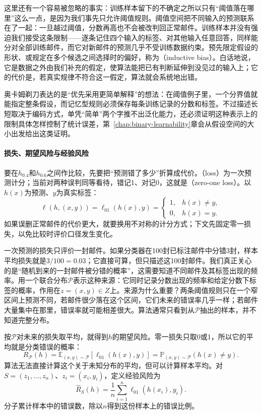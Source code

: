 这里还有一个容易被忽略的事实：训练样本留下的不确定之所以只有“阈值落在哪里”这么一点，是因为我们事先只允许阈值规则。阈值空间把不同输入的预测联系在了一起：一旦越过阈值，分数再高也不会被改判回正常邮件。训练样本并没有强迫我们接受这条限制——逐条记住四个输入的标签、对其他输入任意回答，同样能分对全部训练邮件，而它对新邮件的预测几乎不受训练数据约束。预先限定假设的形状、或规定在多个候选之间选择时的偏好，称为（inductive bias）。白话地说，它是数据之外由我们补充的假定，使算法能把已有判断延伸到没见过的输入上；它的代价是，若真实规律不符合这一假定，算法就会系统地出错。

奥卡姆剃刀表达的是“优先采用更简单解释”的想法：在阈值例子里，一个分界值就能指定整条假设，而记忆型规则必须保存每条训练记录的分数和标签。不过描述长短取决于编码方式，单凭“简单”两个字推不出泛化能力，还必须证明这种表示上的限制具体怎样控制了统计误差，第~\ref{chap:binary-learnability}章会从假设空间的大小出发给出这类证明。

\paragraph{损失、期望风险与经验风险}

要在$h_{0.4}$和$h_{0.6}$之间作比较，先要把“预测错了多少”折算成代价。（loss）为一次预测计分；当前对两种误判同等看待，错记1、对记0，这就是（zero-one loss）。以$h(x)$为预测、$y$为真实标签：
\begin{equation}
 \ell(h,(x,y))=\ell_{01}(h(x),y)=\begin{cases}
  1,&h(x)\neq y,\\
  0,&h(x)=y.
 \end{cases}
 \label{eq:zero-one-loss}
\end{equation}
如果误删正常邮件的代价更大，就要换用不对称的计分方式；下文先固定零一损失，以免比较时评价口径发生变化。

一次预测的损失只评价一封邮件。如果分类器在100封已标注邮件中分错3封，样本平均损失就是$3/100=0.03$；它直接可算，但只描述这100封邮件。我们真正关心的是“随机到来的一封邮件被分错的概率”，这需要知道不同邮件及其标签出现的频率。用一个联合分布$\mathcal P$表示这种来源：它同时记录分数出现的频率和给定分数下标签的概率，作用在$z=(x,y)\in Z$上。来源为什么重要？两条阈值规则只在一个窄区间上预测不同，若邮件很少落在这个区间，它们未来的错误率几乎一样；若邮件大量集中在那里，错误率就可能相差很大。算法通常只看到从$\mathcal P$抽出的样本，并不知道完整分布。

按$\mathcal P$对未来的损失取平均，就得到$h$的期望风险。零一损失只取0或1，所以它的平均就是分类错误的概率：
\begin{equation}
 R_{\mathcal P}(h)
 =\mathbb E_{(x,y)\sim\mathcal P}[\ell_{01}(h(x),y)]
 =\mathbb P_{(x,y)\sim\mathcal P}(h(x)\neq y).
 \label{eq:population-classification-risk}
\end{equation}
算法无法直接计算这个关于未知分布的平均，但可以计算样本平均。对$S=(z_1,\ldots,z_n)$、$z_i=(x_i,y_i)$，定义经验风险为
\begin{equation}
 \hat R_S(h)=\frac1n\sum_{i=1}^n\ell_{01}(h(x_i),y_i).
 \label{eq:empirical-classification-risk}
\end{equation}
分子累计样本中的错误数，除以$n$得到这份样本上的错误比例。

